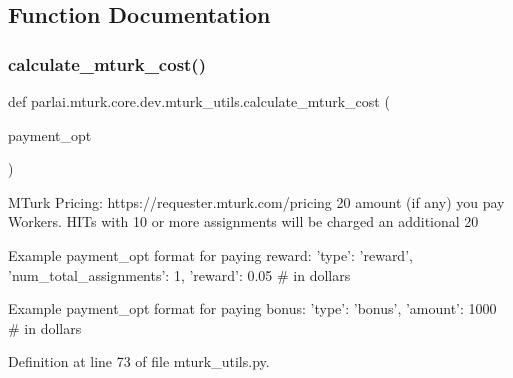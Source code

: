 \subsection{Function Documentation}
\mbox{\label{namespaceparlai_1_1mturk_1_1core_1_1dev_1_1mturk__utils_ab0dab541f46c0b18e96bcbbb536bddf6}} 
\subsubsection{\texorpdfstring{calculate\+\_\+mturk\+\_\+cost()}{calculate\_mturk\_cost()}}
{\footnotesize\ttfamily def parlai.\+mturk.\+core.\+dev.\+mturk\+\_\+utils.\+calculate\+\_\+mturk\+\_\+cost (\begin{DoxyParamCaption}\item[{}]{payment\+\_\+opt }\end{DoxyParamCaption})}

\begin{DoxyVerb}MTurk Pricing: https://requester.mturk.com/pricing 20%
amount (if any) you pay Workers. HITs with 10 or more assignments will be charged an
additional 20%

Example payment_opt format for paying reward:
{
    'type': 'reward',
    'num_total_assignments': 1,
    'reward': 0.05  # in dollars
}

Example payment_opt format for paying bonus:
{
    'type': 'bonus',
    'amount': 1000  # in dollars
}
\end{DoxyVerb}
 

Definition at line 73 of file mturk\+\_\+utils.\+py.


